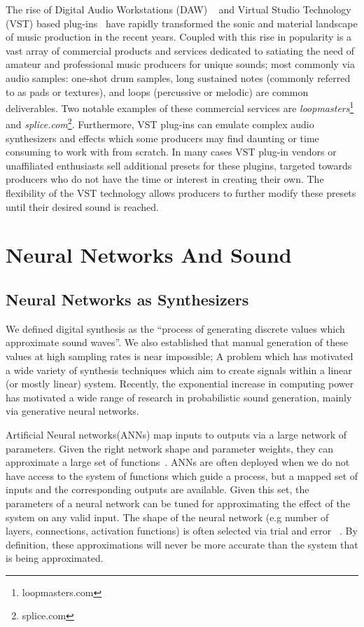 \documentclass[\main/thesis.tex]{subfiles}
\begin{document}
 The rise of Digital Audio Workstations (DAW) ~\cite{leider2004digital} and Virtual Studio Technology (VST) based plug-ins~\cite{tanev2013virtual} have rapidly transformed the sonic and material landscape of music production in the recent years. Coupled with this rise in popularity is a vast array of commercial products and services dedicated to satiating the need of amateur and professional music producers for unique sounds; most commonly via audio samples: one-shot drum samples, long sustained notes (commonly referred to as pads or textures), and loops (percussive or melodic) are common deliverables. Two notable examples of these commercial services are \textit{loopmasters}\footnote{loopmasters.com} and \textit{splice.com}\footnote{splice.com}. Furthermore, VST plug-ins can emulate complex audio synthesizers and effects which some producers may find daunting or time consuming to work with from scratch. In many cases VST plug-in vendors or unaffiliated enthusiasts sell additional presets for these plugins, targeted towards producers who do not have the time or interest in creating their own. The flexibility of the VST technology allows producers to further modify these presets until their desired sound is reached.


\section{Neural Networks And Sound}
\label{bg:NN}

\subsection{Neural Networks as Synthesizers}
We defined digital synthesis as the \enquote{process of generating discrete values which approximate sound waves}. We also established that manual generation of these values at high sampling rates is near impossible; A problem which has motivated a wide variety of synthesis techniques which aim to create signals within a linear (or mostly linear) system. Recently, the exponential increase in computing power has motivated a wide range of research in probabilistic sound generation, mainly via generative neural networks. 

Artificial Neural networks(ANNs) map inputs to outputs via a large network of parameters. Given the right network shape and parameter weights, they can approximate a large set of functions~\cite{cybenko1989approximation,cardaliaguet1992approximation}. ANNs are often deployed when we do not have access to the system of functions which guide a process, but a mapped set of inputs and the corresponding outputs are available. Given this set, the parameters of a neural network can be tuned for approximating the effect of the system on any valid input. The shape of the neural network (e.g number of layers, connections, activation functions) is often selected via trial and error ~\cite{bergstra2012random,bergstra2011algorithms,ba2013adaptive}. By definition, these approximations will never be more accurate than the system that is being approximated. 
\end{document}
